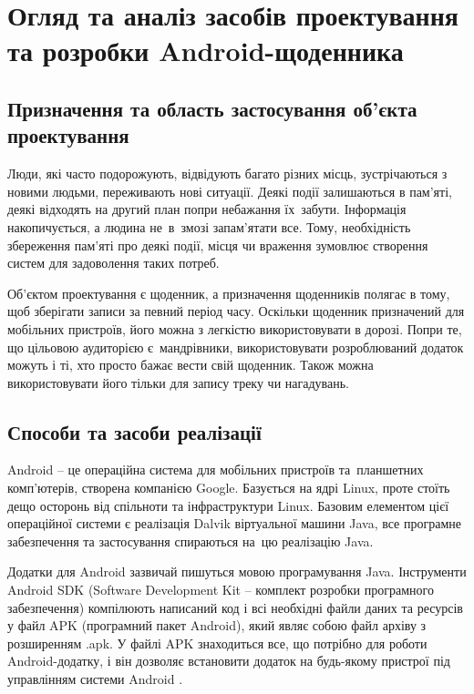 \documentclass[../main.tex]{subfiles}
\begin{document}
\chapter{Огляд та аналіз засобів проектування та розробки Android-щоденника}

\section{Призначення та область застосування об'єкта проектування}

Люди, які часто подорожують, відвідують багато різних місць, зустрічаються з новими людьми, переживають нові ситуації. Деякі події залишаються в пам'яті, деякі відходять на другий план попри небажання їх~забути. Інформація накопичується, а людина не~в~змозі запам'ятати все. Тому, необхідність збереження пам'яті про деякі події, місця чи враження зумовлює створення систем для задоволення таких потреб.

Об'єктом проектування є щоденник, а призначення щоденників полягає в тому, щоб зберігати записи за певний період часу. Оскільки щоденник призначений для мобільних пристроїв, його можна з легкістю використовувати в дорозі. Попри те, що цільовою аудиторією є~мандрівники, використовувати розроблюваний додаток можуть і ті, хто просто бажає вести свій щоденник. Також можна використовувати його тільки для запису треку чи нагадувань.

\section{Способи та засоби реалізації}

Android -- це операційна система для мобільних пристроїв та~планшетних комп'ютерів, створена компанією Google. Базується на ядрі Linux, проте стоїть дещо осторонь від спільноти та інфраструктури Linux. Базовим елементом цієї операційної системи є реалізація Dalvik віртуальної машини Java, все програмне забезпечення та застосування спираються на~цю реалізацію Java.

Додатки для Android зазвичай пишуться мовою програмування Java. Інструменти Android SDK (Software Development Kit -- комплект розробки програмного забезпечення) компілюють написаний код і всі необхідні файли даних та ресурсів у файл APK (програмний пакет Android), який являє собою файл архіву з розширенням .apk. У файлі APK знаходиться все, що потрібно для роботи Android-додатку, і він дозволяє встановити додаток на будь-якому пристрої під управлінням системи Android \cite{android_for_devs}. 
\end{document}
